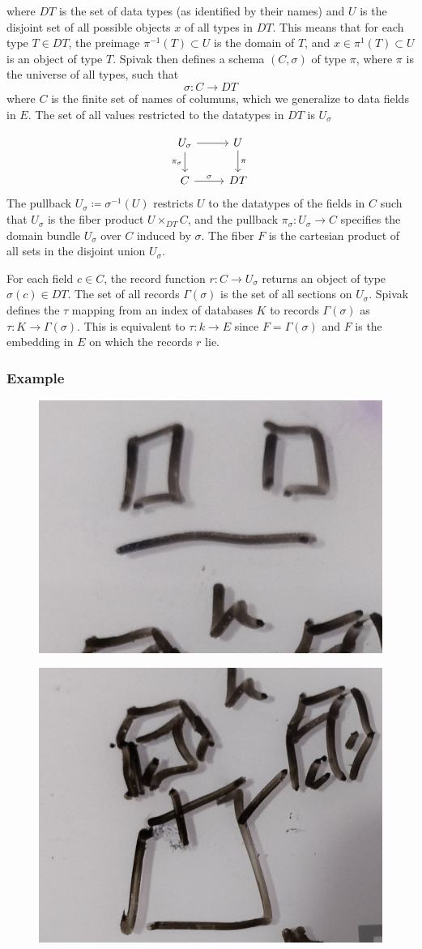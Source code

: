\documentclass[../main.tex]{subfiles}
\begin{document}
where $DT$ is the set of data types (as identified by their names) and $U$ is the disjoint set of all possible objects $x$ of all types in $DT$. This means that for each type $T\in DT$, the preimage $\pi^{-1}(T)\subset U $ is the domain of $T$, and $x \in \pi^{1}(T)\subset U$ is an object of type $T$. Spivak then defines a schema $(C, \sigma)$ of type $\pi$, where $\pi$ is the universe of all types, such that 
\begin{equation}
\sigma: C \rightarrow DT
\end{equation}
where $C$ is the finite set of names of columuns, which we generalize to data fields in $E$. The set of all values restricted to the datatypes in $DT$ is $U_{\sigma}$

\begin{equation}
    \begin{tikzcd}
        U_{\sigma} \arrow[d, "\pi_{\sigma}"'] \arrow[r] & U \arrow[d, "\pi"] \\
        C \arrow[r, "\sigma"]                           & DT                
    \end{tikzcd}
\end{equation}
The pullback $U_{\sigma} \coloneqq \sigma^{-1}(U)$ restricts $U$ to the datatypes of the fields in $C$ such that $U_{\sigma}$ is the fiber product $U \times_{DT} C$, and the pullback $\pi_{\sigma}:U_{\sigma} \rightarrow C$ specifies the domain bundle $U_{\sigma}$ over $C$ induced by $\sigma$. The fiber $F$ is the cartesian product of all sets in the disjoint union $U_{\sigma}$. 

For each field $c \in C$, the record function $r: C \rightarrow U_{\sigma}$ returns an object of type $\sigma(c) \in DT$. The set of all records $\Gamma(\sigma)$ is the set of all sections on $U_\sigma$. Spivak defines the $\tau$ mapping from an index of databases $K$ to records $\Gamma(\sigma)$ as $\tau: K \rightarrow \Gamma(\sigma)$. This is equivalent to $\tau: k \rightarrow E$ since $F = \Gamma(\sigma)$ and $F$ is the embedding in $E$ on which the records $r$ lie.
 
\subsubsection{Example}
\begin{figure}[ht]
    \includegraphics[width=0.2\linewidth]{figures/sections/math/temp_2f.png}
    \label{fig:}
\end{figure}
\begin{figure}[ht]
    \includegraphics[width=0.2\linewidth]{figures/sections/math/temp_3f.png}
\end{figure}
\end{document}

